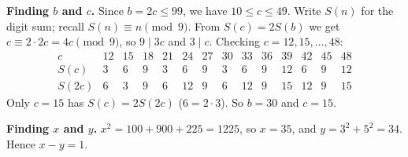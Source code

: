 \textbf{Finding $b$ and $c$.} Since $b=2c\le99$, we have $10\le c\le49$. Write $S(n)$ for the digit sum; recall $S(n)\equiv n\pmod9$. From $S(c)=2S(b)$ we get $c\equiv2\cdot2c=4c\pmod9$, so $9\mid3c$ and $3\mid c$. Checking $c=12,15,\dots,48$:
\[\begin{array}{c|ccccccccccccc} c&12&15&18&21&24&27&30&33&36&39&42&45&48\\ \hline S(c)&3&6&9&3&6&9&3&6&9&12&6&9&12\\ S(2c)&6&3&9&6&12&9&6&12&9&15&12&9&15\end{array}\]
Only $c=15$ has $S(c)=2S(2c)$ ($6=2\cdot3$). So $b=30$ and $c=15$.

\textbf{Finding $x$ and $y$.} $x^2=100+900+225=1225$, so $x=35$, and $y=3^2+5^2=34$. Hence $x-y=\boxed{1}$.
